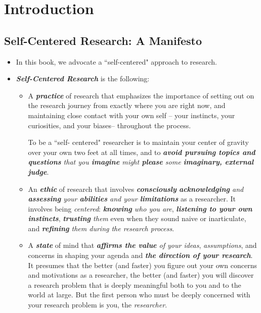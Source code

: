\documentclass[11pt]{article}
\begin{document}
\section{Introduction}
\subsection{Self-Centered Research: A Manifesto}
\begin{itemize}
\item In this book, we advocate a ``self-centered" approach to research. 

\item \emph{\textbf{Self-Centered Research}} is the following:
\begin{itemize}
\item A \emph{\textbf{practice}} of research that emphasizes the importance of setting out on the research journey from exactly where you are right now, and maintaining close contact with your own self -- your instincts, your curiosities, and your biases-- throughout the process.

To be a ``self- centered" researcher is to maintain your center of gravity over your own two feet at all times, and to \emph{\textbf{avoid pursuing topics and questions} that you \textbf{imagine} might \textbf{please} some \textbf{imaginary, external judge}}.

\item An \emph{\textbf{ethic}} of research that involves \emph{\textbf{consciously} \textbf{acknowledging} and \textbf{assessing} your \textbf{abilities} and your \textbf{limitations}} as a researcher. It involves being \emph{centered}: \emph{\textbf{knowing} who you are}, \emph{\textbf{listening to your own instincts}}, \emph{\textbf{trusting} them} even when they sound naive or inarticulate, and \emph{\textbf{refining} them during the research process}.

\item A \emph{\textbf{state}} of mind that \emph{\textbf{affirms the value} of your ideas}, \emph{assumptions}, and concerns in shaping your agenda and \emph{\textbf{the direction of your research}}. It presumes that the better (and faster) you figure out your own concerns and motivations as a researcher, the better (and faster) you will discover a research problem that is deeply meaningful both to you and to the world at large. But the first person who must be deeply concerned with your research problem is you, the \emph{researcher}.
\end{itemize}


\end{itemize}
\end{document}
